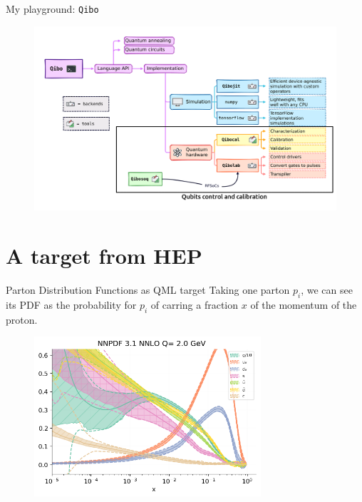 \documentclass[8pt, xcolor={svgnames}, hyperref={linkcolor=black}]{beamer}
\begin{document}
\begin{frame}{My playground: \texttt{Qibo}}
\begin{figure}  
   \includegraphics[width=1\textwidth]{figures/eco3.png}
\end{figure}
\end{frame}

\section{A target from HEP}

\begin{frame}{Parton Distribution Functions as QML target}
Taking one parton $p_i$, we can see its PDF as the probability for $p_i$ of carring 
a fraction $x$ of the momentum of the proton.
\begin{figure}  
   \includegraphics[width=0.75\textwidth]{figures/pdf.png}
\end{figure}
\end{frame}
\end{document}
